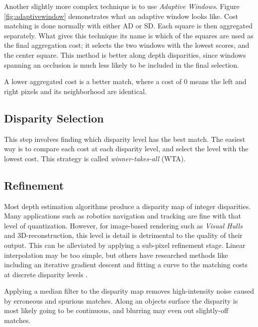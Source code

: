 Another slightly more complex technique is to use \textit{Adaptive
  Windows}\cite{Okutomi and Kanade, 1992; Kanade and Okutomi, 1994;
  Veksler, 2001; Kang et al., 2001)}. Figure \ref{fig:adaptivewindow}
demonstrates what an adaptive window looks like. Cost matching is done
normally with either AD or SD. Each square is then aggregated
separately. What gives this technique its name is which of the squares
are used as the final aggregation cost; it selects the two windows
with the lowest scores, and the center square. This method is better
along depth disparities, since windows spanning an occlusion is much
less likely to be included in the final selection.

A lower aggregated cost is a better match, where a cost of 0 means the
left and right pixels and its neighborhood are identical.

\subsection{Disparity Selection}
\label{sec:disparity_selection}

This step involves finding which disparity level has the best
match. The easiest way is to compare each cost at each disparity
level, and select the level with the lowest cost. This strategy is
called \textit{winner-takes-all} (WTA).




\subsection{Refinement}
\label{sec:refinement}

Most depth estimation algorithms produce a disparity map of integer
disparities. Many applications such as robotics navigation and
tracking are fine with that level of quantization. However, for
image-based rendering such as \textit{Visual Hulls} and
3D-reconstruction, this level is detail is detrimental to the quality
of their output. This can be alleviated by applying a sub-pixel
refinement stage. Linear interpolation may be too simple, but others
have researched methods like including an iterative gradient descent
and fitting a curve to the matching costs at discrete disparity levels
\cite{Ryan et al., 1980; Lucas and Kanade, 1981; Tian and Huhns, 1986;
  Matthies et al., 1989; Kanade and okutomi, 1994, taxonomy}.

Applying a median filter to the disparity map removes high-intensity
noise caused by erroneous and spurious matches. Along an objects
surface the disparity is most likely going to be continuous, and
blurring may even out slightly-off matches.

